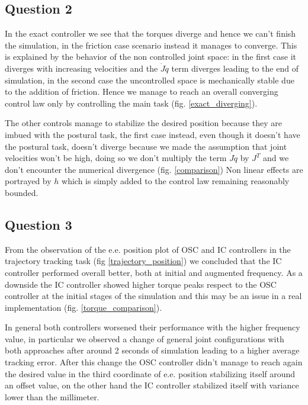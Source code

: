 \documentclass[10pt]{article}
\begin{document}
\subsection{Question 2}

In the exact controller we see that the torques diverge and hence we can't finish the simulation, in the friction case scenario instead it manages to converge. This is explained by the behavior of the non controlled joint space: in the first case it diverges with increasing velocities and the $\dot J \dot q$ term diverges leading to the end of simulation, in the second case the uncontrolled space is mechanically stable due to the addition of friction. Hence we manage to reach an overall converging control law only by controlling the main task (fig. \ref{exact_diverging}).

The other controls manage to stabilize the desired position because they are imbued with the postural task, the first case instead, even though it doesn't have the postural task, doesn't diverge because we made the assumption that joint velocities won't be high, doing so we don't multiply the term $\dot J \dot q$ by $J^T$ and we don't encounter the numerical divergence (fig. \ref{comparison}) Non linear effects are portrayed by $h$ which is simply added to the control law remaining reasonably bounded.

\subsection{Question 3}

From the observation of the e.e. position plot of OSC and IC controllers in the trajectory tracking task (fig \ref{trajectory_position}) we concluded that the IC controller performed overall better, both at initial and augmented frequency. As a downside the IC controller showed higher torque peaks respect to the OSC controller at the initial stages of the simulation and this may be an issue in a real implementation (fig. \ref{torque_comparison}).

In general both controllers worsened their performance with the higher frequency value, in particular we observed a change of general joint configurations with both approaches after around 2 seconds of simulation leading to a higher average tracking error. After this change the OSC controller didn't manage to reach again the desired value in the third coordinate of e.e. position stabilizing itself around an offset value, on the other hand the IC controller stabilized itself with variance lower than the millimeter.
\end{document}
